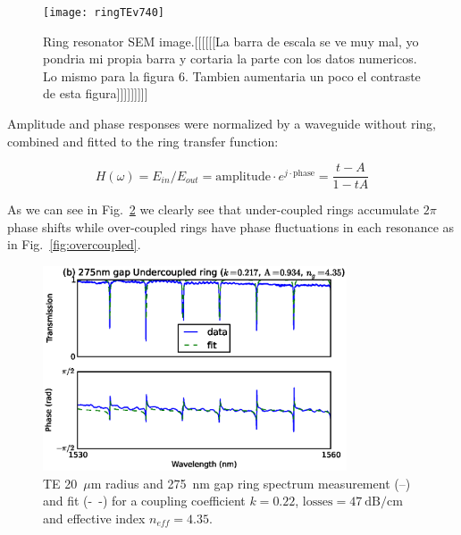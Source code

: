 \documentclass[journal]{IEEEtran}
\begin{document}
\begin{figure}[htb]
    \centering
    \texttt{[image: ringTEv740]}
    \caption{Ring resonator SEM image.[[[[[[La barra de escala se ve muy mal, yo pondria mi propia barra y cortaria la parte con los datos numericos. Lo mismo para la figura 6. Tambien aumentaria un poco el contraste de esta figura]]]]]]]]]}
    \label{fig:semRingPaperRings}
\end{figure}




Amplitude and phase responses were normalized by a waveguide without ring, combined and fitted to the ring transfer function:

\begin{equation}
	H(\omega)=E_{in}/E_{out}=\mathrm{amplitude}\cdot e^{j\cdot \mathrm{phase}} = \frac{t-A}{1-tA}
\end{equation}
 

As we can see in Fig.~\ref{fig:undercoupled} we clearly see that under-coupled rings accumulate $2\pi$ phase shifts while over-coupled rings have phase fluctuations in each resonance as in Fig.~\ref{fig:overcoupled}. 

     
\begin{figure}[htb]
  \centerline{\includegraphics[width=9cm]{r20g275TE_fitPhaseAmp}}
  \caption{TE 20~$\mu$m radius and 275~nm gap ring spectrum measurement (--) and fit (-~-) for a coupling coefficient $k=0.22$, $\mathrm{losses=47~dB/cm}$ and effective index $n_{eff}=4.35$.}
  \label{fig:undercoupled} %
\end{figure}
\end{document}
